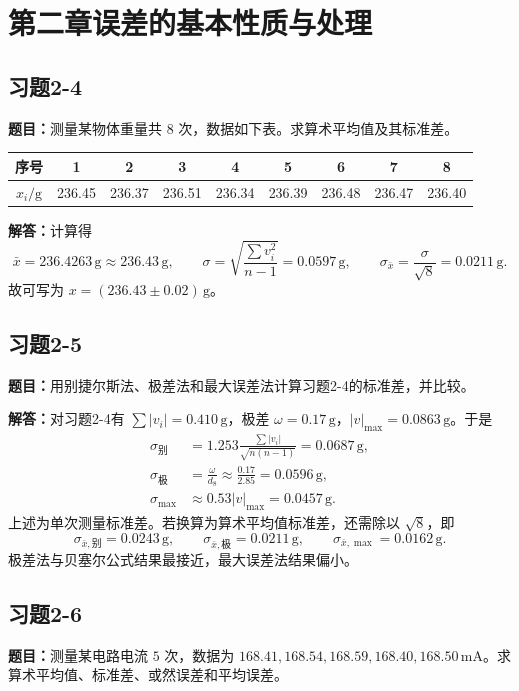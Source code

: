 \documentclass[UTF8,zihao=-4]{ctexart}
\newcommand{\problem}[1]{\subsection*{#1}}
\newcommand{\timu}{\noindent\textbf{题目：}}
\newcommand{\jieda}{\noindent\textbf{解答：}}
\begin{document}
{\section*{第二章\quad 误差的基本性质与处理}

\problem{习题2-4}
\timu 测量某物体重量共 $8$ 次，数据如下表。求算术平均值及其标准差。

\begin{center}
\small
\begin{tabular}{c|cccccccc}
\toprule
序号 & 1 & 2 & 3 & 4 & 5 & 6 & 7 & 8\\
\midrule
$x_i/\mathrm{g}$ & 236.45 & 236.37 & 236.51 & 236.34 & 236.39 & 236.48 & 236.47 & 236.40\\
\bottomrule
\end{tabular}
\end{center}

\jieda 计算得
\begin{equation*}
    \bar{x}=236.4263\,\mathrm{g}\approx236.43\,\mathrm{g},\qquad
    \sigma=\sqrt{\frac{\sum v_i^2}{n-1}}=0.0597\,\mathrm{g},\qquad
    \sigma_{\bar{x}}=\frac{\sigma}{\sqrt{8}}=0.0211\,\mathrm{g}.
\end{equation*}
故可写为 $x=(236.43\pm0.02)\,\mathrm{g}$。

\problem{习题2-5}
\timu 用别捷尔斯法、极差法和最大误差法计算习题2-4的标准差，并比较。

\jieda 对习题2-4有 $\sum |v_i|=0.410\,\mathrm{g}$，极差 $\omega=0.17\,\mathrm{g}$，$|v|_{\max}=0.0863\,\mathrm{g}$。于是
\begin{equation*}
\begin{aligned}
    \sigma_{\text{别}}
    &=1.253\frac{\sum |v_i|}{\sqrt{n(n-1)}}=0.0687\,\mathrm{g},\\
    \sigma_{\text{极}}
    &=\frac{\omega}{d_8}\approx\frac{0.17}{2.85}=0.0596\,\mathrm{g},\\
    \sigma_{\max}
    &\approx0.53|v|_{\max}=0.0457\,\mathrm{g}.
\end{aligned}
\end{equation*}
上述为单次测量标准差。若换算为算术平均值标准差，还需除以 $\sqrt{8}$，即
\begin{equation*}
    \sigma_{\bar{x},\text{别}}=0.0243\,\mathrm{g},\qquad
    \sigma_{\bar{x},\text{极}}=0.0211\,\mathrm{g},\qquad
    \sigma_{\bar{x},\max}=0.0162\,\mathrm{g}.
\end{equation*}
极差法与贝塞尔公式结果最接近，最大误差法结果偏小。

\problem{习题2-6}
\timu 测量某电路电流 $5$ 次，数据为 $168.41,168.54,168.59,168.40,168.50\,\mathrm{mA}$。求算术平均值、标准差、或然误差和平均误差。

}
\end{document}

